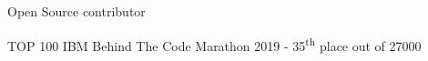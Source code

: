 Open Source contributor	\hfill
 
TOP 100 IBM Behind The Code Marathon 2019 - 35\textsuperscript{th} place out of 27000 

